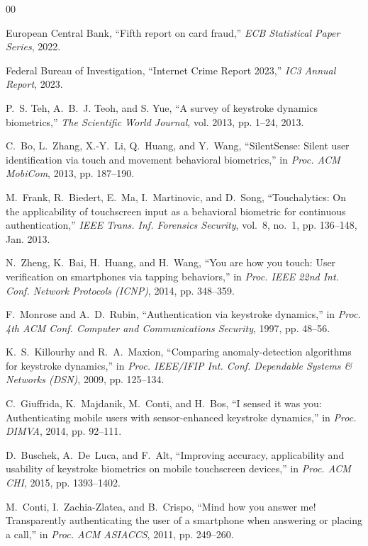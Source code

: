 \documentclass[conference]{IEEEtran}
\begin{document}
\begin{thebibliography}{00}

European Central Bank, ``Fifth report on card fraud,'' \textit{ECB Statistical Paper Series}, 2022.

Federal Bureau of Investigation, ``Internet Crime Report 2023,'' \textit{IC3 Annual Report}, 2023.

P.~S. Teh, A.~B.~J. Teoh, and S. Yue, ``A survey of keystroke dynamics biometrics,'' \textit{The Scientific World Journal}, vol. 2013, pp. 1--24, 2013.

C.~Bo, L.~Zhang, X.-Y.~Li, Q.~Huang, and Y.~Wang, ``SilentSense: Silent user identification via touch and movement behavioral biometrics,'' in \textit{Proc. ACM MobiCom}, 2013, pp. 187--190.

M.~Frank, R.~Biedert, E.~Ma, I.~Martinovic, and D.~Song, ``Touchalytics: On the applicability of touchscreen input as a behavioral biometric for continuous authentication,'' \textit{IEEE Trans. Inf. Forensics Security}, vol.~8, no.~1, pp. 136--148, Jan. 2013.

N.~Zheng, K.~Bai, H.~Huang, and H.~Wang, ``You are how you touch: User verification on smartphones via tapping behaviors,'' in \textit{Proc. IEEE 22nd Int. Conf. Network Protocols (ICNP)}, 2014, pp. 348--359.

F.~Monrose and A.~D.~Rubin, ``Authentication via keystroke dynamics,'' in \textit{Proc. 4th ACM Conf. Computer and Communications Security}, 1997, pp. 48--56.

K.~S.~Killourhy and R.~A.~Maxion, ``Comparing anomaly-detection algorithms for keystroke dynamics,'' in \textit{Proc. IEEE/IFIP Int. Conf. Dependable Systems \& Networks (DSN)}, 2009, pp. 125--134.

C.~Giuffrida, K.~Majdanik, M.~Conti, and H.~Bos, ``I sensed it was you: Authenticating mobile users with sensor-enhanced keystroke dynamics,'' in \textit{Proc. DIMVA}, 2014, pp. 92--111.

D.~Buschek, A.~De~Luca, and F.~Alt, ``Improving accuracy, applicability and usability of keystroke biometrics on mobile touchscreen devices,'' in \textit{Proc. ACM CHI}, 2015, pp. 1393--1402.

M.~Conti, I.~Zachia-Zlatea, and B.~Crispo, ``Mind how you answer me! Transparently authenticating the user of a smartphone when answering or placing a call,'' in \textit{Proc. ACM ASIACCS}, 2011, pp. 249--260.


\end{thebibliography}
\end{document}
